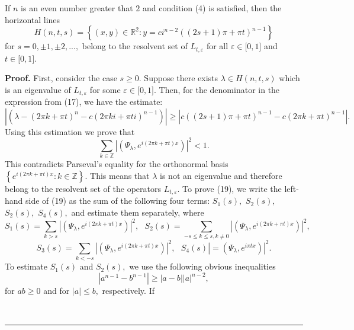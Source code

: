 \documentclass[10pt,a4paper]{amsart}
\newenvironment{proof}[1][Proof]{\textbf{#1.} }{\ \rule{0.5em}{0.5em}}
\begin{document}
\begin{lemma}
If $n$ is an even number greater that $2$ and condition (4) is satisfied, then
the horizontal lines
\[
H(n,t,s)=\left\{  (x,y)\in\mathbb{R}^{2}:y=ci^{n-2}((2s+1)\pi+\pi
t)^{n-1}\right\}
\]
for $s=0,\pm1,\pm2,...,$ belong to the resolvent set of $L_{t,\varepsilon}$
for all $\varepsilon\in\lbrack0,1]$ and $t\in\lbrack0,1].$
\end{lemma}

\begin{proof}
\bigskip First, consider the case $s\geq0$. Suppose there exists $\lambda\in
H(n,t,s)$ which is an eigenvalue of $L_{t,\varepsilon}$ for some
$\varepsilon\in\lbrack0,1].$ Then, for the denominator in the expression from
(17), we have the estimate:
\begin{equation}
\left\vert \left(  \lambda-\left(  2\pi k+\pi t\right)  ^{n}-c(2\pi ki+\pi
ti)^{n-1}\right)  \right\vert \geq\left\vert c((2s+1)\pi+\pi t)^{n-1}-c(2\pi
k+\pi t)^{n-1}\right\vert .\tag{18}%
\end{equation}
Using this estimation we prove that
\begin{equation}
\sum_{k\in\mathbb{Z}}\left\vert \left(  \Psi_{\lambda},e^{i\left(  2\pi k+\pi
t\right)  x}\right)  \right\vert ^{2}<1.\tag{19}%
\end{equation}
This contradicts Parseval's equality for the orthonormal basis $\left\{
e^{i\left(  2\pi k+\pi t\right)  x}:k\in\mathbb{Z}\right\}  .$ This means that
$\lambda$ is not an eigenvalue and therefore belong to the resolvent set of
the operators $L_{t,\varepsilon}$. To prove (19), we write the left-hand side
of (19) as the sum of the following four terms: $S_{1}(s),$ $S_{2}(s),$
$S_{2}(s),$ $S_{4}(s),$ and estimate them separately, where
\[
S_{1}(s)=\sum_{k>s}\left\vert \left(  \Psi_{\lambda},e^{i\left(  2\pi k+\pi
t\right)  x}\right)  \right\vert ^{2},\text{ }S_{2}(s)=\sum_{-s\leq k\leq
s,k\neq0}\left\vert \left(  \Psi_{\lambda},e^{i\left(  2\pi k+\pi t\right)
x}\right)  \right\vert ^{2},
\]%
\[
S_{3}(s)=\sum_{k<-s}\left\vert \left(  \Psi_{\lambda},e^{i\left(  2\pi k+\pi
t\right)  x}\right)  \right\vert ^{2},\text{ }S_{4}(s)\left\vert =\left(
\Psi_{\lambda},e^{i\pi tx}\right)  \right\vert ^{2}.
\]
To estimate $S_{1}(s)$ and $S_{2}(s),$ we use the following obvious
inequalities
\begin{equation}
\left\vert a^{n-1}-b^{n-1}\right\vert \geq\left\vert a-b\right\vert \left\vert
a\right\vert ^{n-2},\tag{20}%
\end{equation}
for $ab\geq0$ and for $\left\vert a\right\vert \leq b,$ respectively. If

\end{proof}
\end{document}
